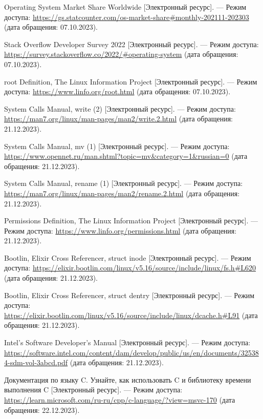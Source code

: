 \begin{thebibliography}{}
	Operating System Market Share Worldwide [Электронный ресурс]. --- Режим доступа: \url{https://gs.statcounter.com/os-market-share#monthly-202111-202303} (дата обращения: 07.10.2023).
	
	Stack Overflow Developer Survey 2022 [Электронный ресурс]. --- Режим доступа: \url{https://survey.stackoverflow.co/2022/#operating-system} (дата обращения: 07.10.2023).

	root Definition, The Linux Information Project [Электронный ресурс]. --- Режим доступа: \url{https://www.linfo.org/root.html} (дата обращения: 07.10.2023).
	
	System Calls Manual, write (2) [Электронный ресурс]. --- Режим доступа: \url{https://man7.org/linux/man-pages/man2/write.2.html} (дата обращения: 21.12.2023).

	System Calls Manual, mv (1) [Электронный ресурс]. --- Режим доступа: \url{https://www.opennet.ru/man.shtml?topic=mv&category=1&russian=0} (дата обращения: 21.12.2023).
	
	System Calls Manual, rename (1) [Электронный ресурс]. --- Режим доступа: \url{https://man7.org/linux/man-pages/man2/rename.2.html} (дата обращения: 21.12.2023).

	Permissions Definition, The Linux Information Project [Электронный ресурс]. --- Режим доступа: \url{https://www.linfo.org/permissions.html} (дата обращения: 21.12.2023).

	Bootlin, Elixir Cross Referencer, struct inode [Электронный ресурс]. --- Режим доступа: \url{https://elixir.bootlin.com/linux/v5.16/source/include/linux/fs.h#L620} (дата обращения: 21.12.2023).

	Bootlin, Elixir Cross Referencer, struct dentry [Электронный ресурс]. --- Режим доступа: \url{https://elixir.bootlin.com/linux/v5.16/source/include/linux/dcache.h#L91} (дата обращения: 21.12.2023).

	Intel's Software Developer's Manual [Электронный ресурс]. --- Режим доступа: \url{https://software.intel.com/content/dam/develop/public/us/en/documents/325384-sdm-vol-3abcd.pdf} (дата обращения: 21.12.2023).

	Документация по языку C. Узнайте, как использовать C и библиотеку времени выполнения C [Электронный ресурс]. --- Режим доступа: \url{https://learn.microsoft.com/ru-ru/cpp/c-language/?view=msvc-170} (дата обращения: 22.12.2023).


\end{thebibliography}
